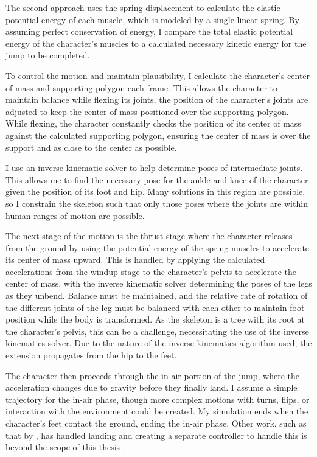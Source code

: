 The second approach uses the spring displacement to calculate the elastic potential energy of each muscle, which is modeled by a single linear spring.  By assuming perfect conservation of energy, I compare the total elastic potential energy of the character's muscles to a calculated necessary kinetic energy for the jump to be completed.

To control the motion and maintain plausibility, I calculate the character's center of mass and supporting polygon each frame.  This allows the character to maintain balance while flexing its joints, the position of the character's joints are adjusted to keep the center of mass positioned over the supporting polygon.  While flexing, the character constantly checks the position of its center of mass against the calculated supporting polygon, ensuring the center of mass is over the support and as close to the center as possible.

I use an inverse kinematic solver to help determine poses of intermediate joints.  This allows me to find the necessary pose for the ankle and knee of the character given the position of its foot and hip.  Many solutions in this region are possible, so I constrain the skeleton such that only those poses where the joints are within human ranges of motion are possible.

The next stage of the motion is the thrust stage where the character releases from the ground by using the potential energy of the spring-muscles to accelerate its center of mass upward.  This is handled by applying the calculated accelerations from the windup stage to the character's pelvis to accelerate the center of mass, with the inverse kinematic solver determining the poses of the legs as they unbend.  Balance must be maintained, and the relative rate of rotation of the different joints of the leg must be balanced with each other to maintain foot position while the body is transformed.  As the skeleton is a tree with its root at the character's pelvis, this can be a challenge, necessitating the use of the inverse kinematics solver.  Due to the nature of the inverse kinematics algorithm used, the extension propagates from the hip to the feet.  

The character then proceeds through the in-air portion of the jump, where the acceleration changes due to gravity before they finally land.  I assume a simple trajectory for the in-air phase, though more complex motions with turns, flips, or interaction with the environment could be created.  My simulation ends when the character's feet contact the ground, ending the in-air phase.  Other work, such as that by \liufall, has handled landing and creating a separate controller to handle this is beyond the scope of this thesis \cite{falling_landing}.

